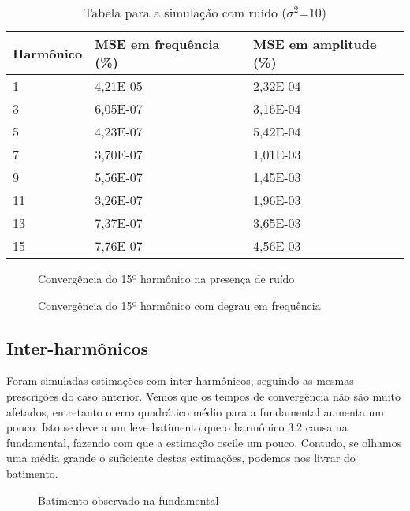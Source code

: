 \begin{table}[H]
	\centering
	\begin{tabular}{|p{2.5cm}|p{2.5cm}|p{2.5cm}|}
		\hline
		Harmônico & MSE em frequência (\%) & MSE em amplitude (\%)\\
		\hline
		1  & 4,21E-05 & 2,32E-04 \\
		3  & 6,05E-07 & 3,16E-04 \\
		5  & 4,23E-07 & 5,42E-04 \\
		7  & 3,70E-07 & 1,01E-03 \\
		9  & 5,56E-07 & 1,45E-03 \\
		11 & 3,26E-07 & 1,96E-03 \\
		13 & 7,37E-07 & 3,65E-03 \\
		15 & 7,76E-07 & 4,56E-03 \\
		\hline
	\end{tabular}
	\caption{Tabela para a simulação com ruído ($\sigma ^2$=10)}
\end{table}

\begin{figure}[H]
	\centering    
	\def\svgscale{1}
	
	\caption{Convergência do 15º harmônico na presença de ruído}
	\label{fig:esquema_pll}
\end{figure}

\begin{figure}[H]
	\centering    
	\def\svgscale{1}
	
	\caption{Convergência do 15º harmônico com degrau em frequência}
	\label{fig:esquema_pll}
\end{figure}

\subsection{Inter-harmônicos}

Foram simuladas estimações com inter-harmônicos, seguindo as mesmas prescrições do caso anterior. Vemos que os tempos de convergência não são muito afetados, entretanto o erro quadrático médio para a fundamental aumenta um pouco. Isto se deve a um leve batimento que o harmônico 3.2 causa na fundamental, fazendo com que a estimação oscile um pouco. Contudo, se olhamos uma média grande o suficiente destas estimações, podemos nos livrar do batimento.

\begin{figure}[H]
	\centering    
	\def\svgscale{1}
	
	\caption{Batimento observado na fundamental}
	\label{fig:esquema_pll}
\end{figure}

